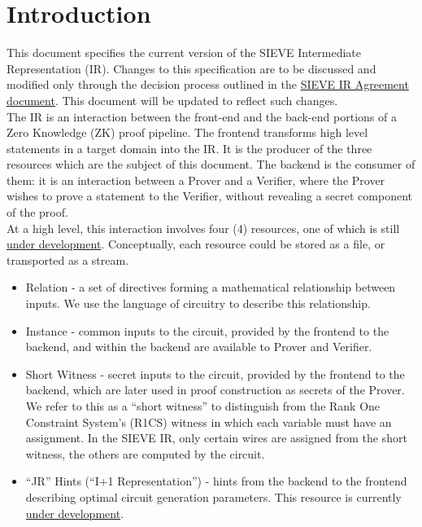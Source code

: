 \documentclass[12pt]{article}
\begin{document}
\newpage
\tableofcontents
\newpage

\section{Introduction}\label{intro}

This document specifies the current version of the SIEVE Intermediate Representation (IR).
Changes to this specification are to be discussed and modified only through the decision process outlined in the \href{https://docs.google.com/document/d/1imP-9fXy8fQwr1e6ZEuhHnVDGkh1YdUOjEd1ifas6IM/edit?ts=5f614241&pli=1}{SIEVE IR Agreement document}.
This document will be updated to reflect such changes. \\

The IR is an interaction between the front-end and the back-end portions of a Zero Knowledge (ZK) proof pipeline.
The frontend transforms high level statements in a target domain into the IR.
It is the producer of the three resources which are the subject of this document.
The backend is the consumer of them: it is an interaction between a Prover and a Verifier, where the Prover wishes to prove a statement to the Verifier, without revealing a secret component of the proof. \\

At a high level, this interaction involves four (4) resources, one of which is still \href{https://github.mit.edu/sieve-all/collaboration/issues/15}{under development}.
Conceptually, each resource could be stored as a file, or transported as a stream.
\begin{itemize}
  \item Relation - a set of directives forming a mathematical relationship between inputs. We use the language of circuitry to describe this relationship.
  \item Instance - common inputs to the circuit, provided by the frontend to the backend, and within the backend are available to Prover and Verifier.
  \item Short Witness - secret inputs to the circuit, provided by the frontend to the backend, which are later used in proof construction as secrets of the Prover.
  We refer to this as a ``short witness'' to distinguish from the Rank One Constraint System's (R1CS) witness in which each variable must have an assignment.
In the SIEVE IR, only certain wires are assigned from the short witness, the others are computed by the circuit.
  \item ``JR'' Hints (``I+1 Representation'') - hints from the backend to the frontend describing optimal circuit generation parameters. This resource is currently \href{https://github.mit.edu/sieve-all/collaboration/issues/15}{under development}.
\end{itemize}
\end{document}
